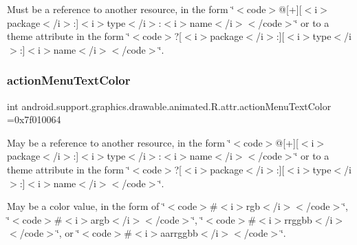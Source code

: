 Must be a reference to another resource, in the form \char`\"{}$<$code$>$@\mbox{[}+\mbox{]}\mbox{[}$<$i$>$package$<$/i$>$\+:\mbox{]}$<$i$>$type$<$/i$>$\+:$<$i$>$name$<$/i$>$$<$/code$>$\char`\"{} or to a theme attribute in the form \char`\"{}$<$code$>$?\mbox{[}$<$i$>$package$<$/i$>$\+:\mbox{]}\mbox{[}$<$i$>$type$<$/i$>$\+:\mbox{]}$<$i$>$name$<$/i$>$$<$/code$>$\char`\"{}. \mbox{\label{classandroid_1_1support_1_1graphics_1_1drawable_1_1animated_1_1R_1_1attr_aa4a600af765c1e79751967f00fd8aa1e}} 
\subsubsection{\texorpdfstring{action\+Menu\+Text\+Color}{actionMenuTextColor}}
{\footnotesize\ttfamily int android.\+support.\+graphics.\+drawable.\+animated.\+R.\+attr.\+action\+Menu\+Text\+Color =0x7f010064\hspace{0.3cm}{\ttfamily [static]}}

May be a reference to another resource, in the form \char`\"{}$<$code$>$@\mbox{[}+\mbox{]}\mbox{[}$<$i$>$package$<$/i$>$\+:\mbox{]}$<$i$>$type$<$/i$>$\+:$<$i$>$name$<$/i$>$$<$/code$>$\char`\"{} or to a theme attribute in the form \char`\"{}$<$code$>$?\mbox{[}$<$i$>$package$<$/i$>$\+:\mbox{]}\mbox{[}$<$i$>$type$<$/i$>$\+:\mbox{]}$<$i$>$name$<$/i$>$$<$/code$>$\char`\"{}. 

May be a color value, in the form of \char`\"{}$<$code$>$\#$<$i$>$rgb$<$/i$>$$<$/code$>$\char`\"{}, \char`\"{}$<$code$>$\#$<$i$>$argb$<$/i$>$$<$/code$>$\char`\"{}, \char`\"{}$<$code$>$\#$<$i$>$rrggbb$<$/i$>$$<$/code$>$\char`\"{}, or \char`\"{}$<$code$>$\#$<$i$>$aarrggbb$<$/i$>$$<$/code$>$\char`\"{}. \mbox{\label{classandroid_1_1support_1_1graphics_1_1drawable_1_1animated_1_1R_1_1attr_a4ec2434077e4165be480e3e660ac56ee}} 
